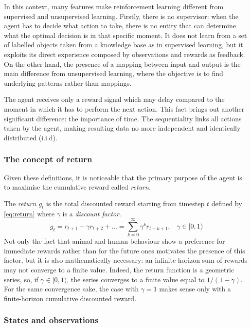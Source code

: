 In this context, many features make reinforcement learning different from supervised and unsupervised learning.
Firstly, there is no supervisor: when the agent has to decide what action to take, there is no entity that can determine what the optimal decision is in that specific moment.
It does not learn from a set of labelled objects taken from a knowledge base as in supervised learning, but it exploits its direct experience composed by observations and rewards as feedback.
On the other hand, the presence of a mapping between input and output is the main difference from unsupervised learning, where the objective is to find underlying patterns rather than mappings.

The agent receives only a reward signal which may delay compared to the moment in which it has to perform the next action.
This fact brings out another significant difference: the importance of time.
The sequentiality links all actions taken by the agent, making resulting data no more independent and identically distributed (i.i.d).

\subsubsection{The concept of return}

Given these definitions, it is noticeable that the primary purpose of the agent is to maximise the cumulative reward called \textit{return}.


The \textit{return $g_t$} is the total discounted reward starting from timestep $t$ defined by \vref{eq:return} where $\gamma$ is a \textit{discount factor}.
\begin{equation} \label{eq:return}
	g_t = r_{t+1} + \gamma r_{t+2} + \dots = \sum_{k=0}^{\infty} \gamma^k r_{t+k+1}, \;\;\;\gamma \in [0,1)
\end{equation}
Not only the fact that animal and human behaviour show a preference for immediate rewards rather than for the future ones motivates the presence of this factor, but it is also mathematically necessary: an infinite-horizon sum of rewards may not converge to a finite value.
Indeed, the return function is a geometric series, so, if $\gamma \in [0,1)$, the series converges to a finite value equal to $1/(1-\gamma)$.
For the same convergence sake, the case with $\gamma = 1$ makes sense only with a finite-horizon cumulative discounted reward.

\subsubsection{States and observations}

